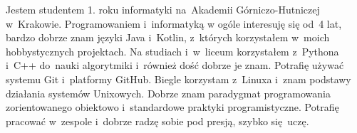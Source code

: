 \documentclass[8pt]{developercv} %
\begin{document}

\begin{minipage}[t]{0.5\textwidth} %
  \vspace{-\baselineskip} %
  Jestem studentem 1. roku informatyki na~Akademii Górniczo-Hutniczej w~Krakowie.
  Programowaniem i~informatyką w ogóle interesuję się od~4 lat, bardzo dobrze znam języki
  Java i~Kotlin, z~których korzystałem w~moich hobbystycznych projektach.
  Na studiach i~w~liceum korzystałem z~Pythona i~C++ do~nauki algorytmiki
  i~również dość dobrze je znam.
  Potrafię używać systemu Git i~platformy GitHub.
  Biegle korzystam z~Linuxa i~znam podstawy działania systemów Unixowych.
  Dobrze znam paradygmat programowania zorientowanego obiektowo i~standardowe praktyki programistyczne.
  Potrafię pracować w~zespole i~dobrze radzę sobie pod presją, szybko się~uczę.

\end{minipage}
\hfill %
\begin{minipage}[t]{0.45\textwidth} %
	\vspace{-\baselineskip} %
	\begin{barchart}{5.5}
	\end{barchart}
\end{minipage}



\end{document}
